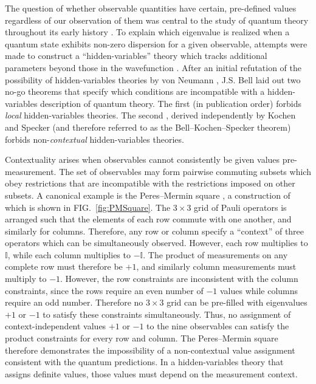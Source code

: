 \documentclass[%
 aip,
 amsmath,amssymb,
 reprint,%
]{revtex4-1}
\newcommand{\Id}{\mathbb{I}}       %
\begin{document}
\indent The question of whether observable quantities have certain, pre-defined values regardless of our observation of them was central to the study of quantum theory throughout its early history \cite{einstein1935Can}. 
To explain which eigenvalue is realized when a quantum state exhibits non-zero dispersion for a given observable, attempts were made to construct a ``hidden-variables'' theory which tracks additional parameters beyond those in the wavefunction \cite{debroglie1930Introduction, bohm1952Suggested, bohm1952Suggesteda, mermin1993Hidden}. 
After an initial refutation of the possibility of hidden-variables theories by von Neumann \cite{vonneumann2018Mathematical, albertson1961Neumanns}, 
J.S. Bell laid out two no-go theorems that specify which conditions are incompatible with a hidden-variables description of quantum theory. The first \cite{bellt}
(in publication order)
forbids \textit{local} hidden-variables theories.  The second \cite{bell1966Problem}, derived independently by Kochen and Specker \cite{kochen1967Problem} (and therefore referred to as the Bell--Kochen--Specker theorem) forbids non-\textit{contextual} hidden-variables theories.

Contextuality arises when observables cannot consistently be given values pre-measurement. The set of observables may form pairwise commuting subsets which obey restrictions that are incompatible with the restrictions imposed on other subsets. A canonical example is the Peres--Mermin square \cite{PERES1990107, mermin1990Simple,mermin1993Hidden}, a construction of which is shown in FIG.~\ref{fig:PMSquare}. The $3\times 3$ grid of Pauli operators is arranged such that the elements of each row commute with one another, and similarly for columns. Therefore, any row or column specify a ``context'' of three operators which can be simultaneously observed. However, each row multiplies to $\Id$, while each column multiplies to $-\Id$. The product of measurements on any complete row must therefore be $+1$, and similarly column measurements must multiply to $-1$. However, the row constraints are inconsistent with the column constraints, since the rows require an even number of $-1$ values while columns require an odd number. Therefore no $3\times 3$ grid can be pre-filled with eigenvalues $+1$ or $-1$ to satisfy these constraints simultaneously. Thus, no assignment of context-independent values $+1$ or $-1$ to the nine observables can satisfy the product constraints for every row and column. The Peres--Mermin square therefore demonstrates the impossibility of a non-contextual value assignment consistent with the quantum predictions. In a hidden-variables theory that assigns definite values, those values must depend on the measurement context.
\end{document}
